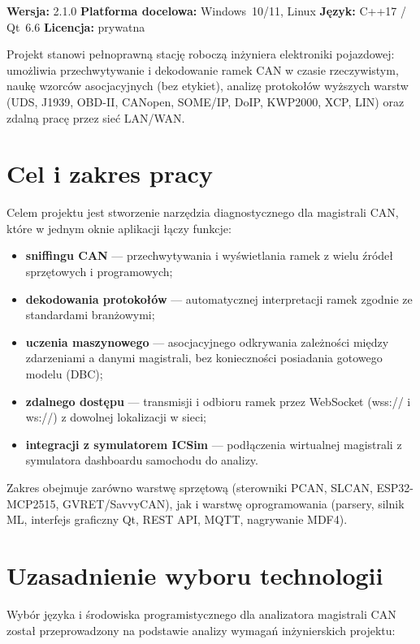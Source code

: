 \documentclass[12pt, a4paper]{article}
\begin{document}
\textbf{Wersja:} 2.1.0 \quad \textbf{Platforma docelowa:} Windows~10/11, Linux
\quad \textbf{Język:} C++17 / Qt~6.6 \quad \textbf{Licencja:} prywatna

Projekt stanowi pełnoprawną stację roboczą inżyniera elektroniki pojazdowej:
umożliwia przechwytywanie i dekodowanie ramek CAN w czasie rzeczywistym,
naukę wzorców asocjacyjnych (bez etykiet), analizę protokołów wyższych warstw
(UDS, J1939, OBD-II, CANopen, SOME/IP, DoIP, KWP2000, XCP, LIN)
oraz zdalną pracę przez sieć LAN/WAN.

\section{Cel i zakres pracy}

Celem projektu jest stworzenie narzędzia diagnostycznego dla magistrali CAN,
które w jednym oknie aplikacji łączy funkcje:
\begin{itemize}
  \item \textbf{sniffingu CAN} --- przechwytywania i wyświetlania ramek
        z wielu źródeł sprzętowych i programowych;
  \item \textbf{dekodowania protokołów} --- automatycznej interpretacji
        ramek zgodnie ze standardami branżowymi;
  \item \textbf{uczenia maszynowego} --- asocjacyjnego odkrywania
        zależności między zdarzeniami a danymi magistrali,
        bez konieczności posiadania gotowego modelu (DBC);
  \item \textbf{zdalnego dostępu} --- transmisji i odbioru ramek przez
        WebSocket (wss:// i ws://) z dowolnej lokalizacji w sieci;
  \item \textbf{integracji z symulatorem ICSim} --- podłączenia wirtualnej
        magistrali z symulatora dashboardu samochodu do analizy.
\end{itemize}

Zakres obejmuje zarówno warstwę sprzętową (sterowniki PCAN, SLCAN, ESP32-MCP2515,
GVRET/SavvyCAN), jak i warstwę oprogramowania (parsery, silnik ML,
interfejs graficzny Qt, REST API, MQTT, nagrywanie MDF4).

\section{Uzasadnienie wyboru technologii}

Wybór języka i środowiska programistycznego dla analizatora magistrali CAN został
przeprowadzony na podstawie analizy wymagań inżynierskich projektu:
\end{document}
